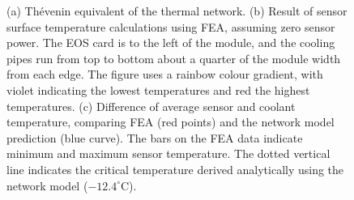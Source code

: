 \begin{figure}[ht]
\centering
{}\quad
{}\quad\quad
{}
\caption{(a) Th\'{e}venin equivalent of the thermal network. (b) Result of sensor surface temperature calculations using FEA, assuming zero sensor power. The EOS card is to the left of the module, and the cooling pipes run from top to bottom about a quarter of the module width from each edge. The figure uses a rainbow colour gradient, with violet indicating the lowest temperatures and red the highest temperatures. (c) Difference of average sensor and coolant temperature, comparing FEA (red points) and the network model prediction (blue curve). The bars on the FEA data indicate minimum and maximum sensor temperature. The dotted vertical line indicates the critical temperature derived analytically using the network model ($-12.4^\circ$C).}
\label{fig:verification}
\end{figure}
